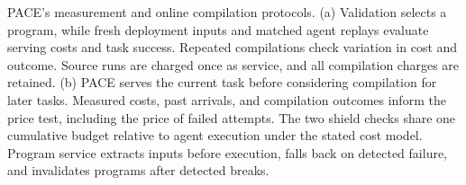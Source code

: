 \caption{PACE's measurement and online compilation protocols.
(a) Validation selects a program, while fresh deployment inputs and matched agent replays evaluate serving costs and task success.
Repeated compilations check variation in cost and outcome.
Source runs are charged once as service, and all compilation charges are retained.
(b) PACE serves the current task before considering compilation for later tasks.
Measured costs, past arrivals, and compilation outcomes inform the price test, including the price of failed attempts.
The two shield checks share one cumulative budget relative to agent execution under the stated cost model.
Program service extracts inputs before execution, falls back on detected failure, and invalidates programs after detected breaks.}
